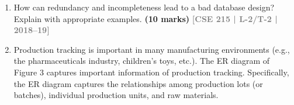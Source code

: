 \documentclass[12pt,a3paper]{article}
\newcommand{\yr}[1]{\hfill\textcolor{gray}{\small\textbf{[#1]}}}
\newcommand{\mk}[1]{\textcolor{orange!70!black}{\small\textbf{(#1 marks)}}}
\begin{document}
\begin{enumerate}
\begin{center}
\end{center}

\mk{10} \yr{CSE 215 | L-2/T-2 | 2019--20}



\item How can redundancy and incompleteness lead to a bad database design? Explain with appropriate examples.
\mk{10} \yr{CSE 215 | L-2/T-2 | 2018--19}

\item Production tracking is important in many manufacturing environments (e.g., the pharmaceuticals
industry, children's toys, etc.). The ER diagram of Figure 3 captures important
information of production tracking. Specifically, the ER diagram captures the relationships
among production lots (or batches), individual production units, and raw materials.


\end{enumerate}
\end{document}
